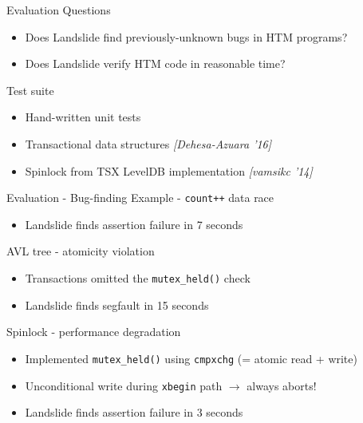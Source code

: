 \documentclass[xcolor=dvipsnames]{beamer}
\begin{document}
\begin{frame}{Evaluation}
	Questions
	\begin{itemize}
		\item Does Landslide find previously-unknown bugs in HTM programs?
		\item Does Landslide verify HTM code in reasonable time?
	\end{itemize}
	\linegap

	Test suite
	\begin{itemize}
		\item Hand-written unit tests
		\item Transactional data structures {\em [Dehesa-Azuara '16]}
		\item Spinlock from TSX LevelDB implementation {\em [vamsikc '14]}
	\end{itemize}
\end{frame}

\begin{frame}{Evaluation - Bug-finding}
	Example - {\tt count++} data race
	\begin{itemize}
		\item Landslide finds assertion failure in 7 seconds %
	\end{itemize}
	\linegap

	AVL tree - atomicity violation
	\begin{itemize}
		\item Transactions omitted the {\tt mutex\_held()} check
		\item Landslide finds segfault in 15 seconds %
	\end{itemize}
	\linegap

	Spinlock - performance degradation
	\begin{itemize}
		\item Implemented {\tt mutex\_held()} using {\tt cmpxchg} (= atomic read + write)
		\item Unconditional write during {\tt xbegin} path $\rightarrow$ always aborts!
		\item Landslide finds assertion failure in 3 seconds %
	\end{itemize}
\end{frame}
\end{document}
